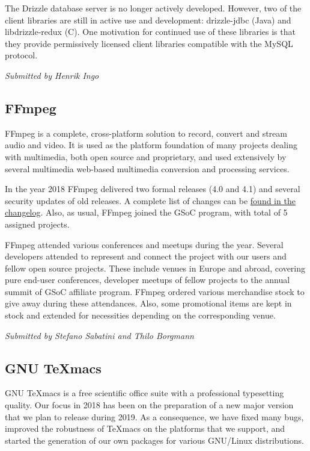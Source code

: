 \documentclass[a4paper]{report}
\begin{document}
The Drizzle database server is no longer actively developed.  However,
two of the client libraries are still in active use and development:
drizzle-jdbc (Java) and libdrizzle-redux (C).  One motivation for
continued use of these libraries is that they provide permissively
licensed client libraries compatible with the MySQL protocol.

{\em Submitted by Henrik Ingo}

\subsection{FFmpeg}

FFmpeg is a complete, cross-platform solution to record, convert and
stream audio and video. It is used as the platform foundation of many
projects dealing with multimedia, both open source and proprietary, and
used extensively by several multimedia web-based multimedia conversion
and processing services.

In the year 2018 FFmpeg delivered two formal releases (4.0 and 4.1) and
several security updates of old releases. A complete list of changes can
be \href{https://git.ffmpeg.org/gitweb/ffmpeg.git/blob/HEAD:/Changelog}{found
in the changelog}.  Also, as usual, FFmpeg joined the GSoC program, with
total of 5 assigned projects.

FFmpeg attended various conferences and meetups during the year.
Several developers attended to represent and connect the project with
our users and fellow open source projects.  These include venues in
Europe and abroad, covering pure end-user conferences, developer meetups
of fellow projects to the annual summit of GSoC affiliate program.
FFmpeg ordered various merchandise stock to give away during these
attendances. Also, some promotional items are kept in stock and extended
for necessities depending on the corresponding venue.

{\em Submitted by Stefano Sabatini and Thilo Borgmann}

\subsection{GNU TeXmacs}

GNU TeXmacs is a free scientific office suite with a professional
typesetting quality.  Our focus in 2018 has been on the preparation of a
new major version that we plan to release during 2019.  As a
consequence, we have fixed many bugs, improved the robustness of TeXmacs
on the platforms that we support, and started the generation of our own
packages for various GNU/Linux distributions.
\end{document}
